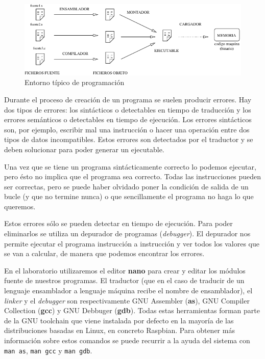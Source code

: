 \begin{figure}[h]
  \centering
    \includegraphics[width=13cm]{graphs/ensamblado.pdf}
  \caption{Entorno típico de programación}
  \label{fig:entorno}
\end{figure}

Durante el proceso de creación de un programa se suelen producir errores.
Hay dos tipos de errores: los sintácticos o detectables en tiempo de
traducción y los errores semánticos o detectables en tiempo de ejecución.
Los errores sintácticos son, por ejemplo, escribir mal una instrucción o
hacer una operación entre dos tipos de datos incompatibles.
Estos errores son detectados por el traductor y se deben solucionar para
poder generar un ejecutable.

Una vez que se tiene un programa sintácticamente correcto lo podemos
ejecutar, pero ésto no implica que el programa sea correcto. Todas las
instrucciones pueden ser correctas, pero se puede haber olvidado poner la
condición de salida de un bucle (y que no termine nunca) o que
sencillamente el programa no haga lo que queremos.

Estos errores sólo se pueden detectar en tiempo de ejecución.
Para poder eliminarlos se utiliza un depurador de programas ({\it debugger}).
El depurador nos permite ejecutar el programa instrucción a instrucción y
ver todos los valores que se van a calcular, de manera que podemos encontrar
los errores.

En el laboratorio utilizaremos el editor {\bf nano} para crear
y editar los módulos fuente de nuestros programas. El traductor
(que en el caso de traducir de un lenguaje ensamblador a lenguaje máquina
recibe el nombre de ensamblador), el {\it linker} y el {\it debugger} son
respectivamente GNU Assembler ({\bf as}), GNU Compiler Collection ({\bf gcc})
y GNU Debbuger ({\bf gdb}). Todas estas herramientas forman parte de la
GNU toolchain que viene instalada por defecto en la mayoría de las distribuciones
basadas en Linux, en concreto Raspbian. Para obtener más información sobre estos
comandos se puede recurrir a la ayuda del sistema con {\tt man as}, {\tt man gcc} y
{\tt man gdb}.


